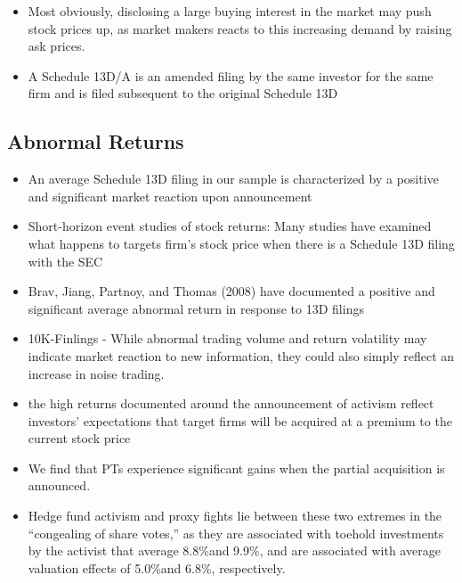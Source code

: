 \documentclass[12pt]{article}
\begin{document}
\begin{itemize}
        \item Most obviously, disclosing a large buying interest in the market may push stock prices up, as market makers reacts to this increasing demand by raising ask prices. \citep{Giglia2018}
        
        \item A Schedule 13D/A is an amended filing by the same investor for the same firm and is filed subsequent to the original Schedule 13D \citep{Klein2009}
    \end{itemize}

\subsection{Abnormal Returns}
    \begin{itemize}
        \item An average Schedule 13D filing in our sample is characterized by a positive and significant market reaction upon announcement \citep{Collin-Dufresne2015}

        \item Short-horizon event studies of stock returns: Many studies have examined what happens to targets firm’s stock price when there is a Schedule 13D filing with the SEC \citep{CoffeeJr.2014}

        \item Brav, Jiang, Partnoy, and Thomas (2008) have documented a positive and significant average abnormal return in response to 13D filings \citep{Brigida2012}

        \item 10K-Finlings - While abnormal trading volume and return volatility may indicate market reaction to new information, they could also simply reflect an increase in noise trading. \citep{You2009}

        \item the high returns documented around the announcement of activism reflect investors’ expectations that target firms will be acquired at a premium to the current stock price \citep{Greenwood2009}

        \item We find that PTs experience significant gains when the partial acquisition is announced. \citep{Akhigbe2007}
        
        
        \item Hedge fund activism and proxy fights lie between these two extremes in the “congealing of share votes,” as they are associated with toehold investments by the activist that average 8.8\%and 9.9\%, and are associated with average valuation effects of 5.0\%and 6.8\%, respectively.\citep{Denes2017}


\end{itemize}
\end{document}
